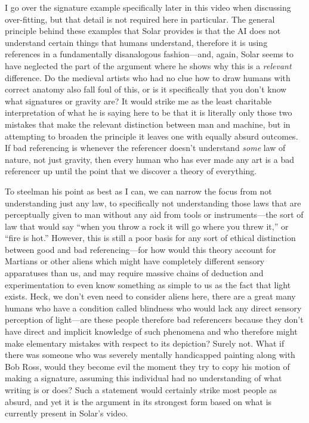 \documentclass[11pt]{article}
\begin{document}
I go over the signature example specifically later in this video when discussing over-fitting, but that detail is not required here in particular. The general principle behind these examples that Solar provides is that the AI does not understand certain things that humans understand, therefore it is using references in a fundamentally disanalogous fashion---and, again, Solar seems to have neglected the part of the argument where he shows why this is a \emph{relevant} difference. Do the medieval artists who had no clue how to draw humans with correct anatomy also fall foul of this, or is it specifically that you don't know what signatures or gravity are? It would strike me as the least charitable interpretation of what he is saying here to be that it is literally only those two mistakes that make the relevant distinction between man and machine, but in attempting to broaden the principle it leaves one with equally absurd outcomes. If bad referencing is whenever the referencer doesn't understand \emph{some} law of nature, not just gravity, then every human who has ever made any art is a bad referencer up until the point that we discover a theory of everything.

To steelman his point as best as I can, we can narrow the focus from not understanding just any law, to specifically not understanding those laws that are perceptually given to man without any aid from tools or instruments---the sort of law that would say ``when you throw a rock it will go where you threw it,'' or ``fire is hot.'' However, this is still a poor basis for any sort of ethical distinction between good and bad referencing---for how would this theory account for Martians or other aliens which might have completely different sensory apparatuses than us, and may require massive chains of deduction and experimentation to even know something as simple to us as the fact that light exists. Heck, we don't even need to consider aliens here, there are a great many humans who have a condition called blindness who would lack any direct sensory perception of light---are these people therefore bad referencers because they don't have direct and implicit knowledge of such phenomena and who therefore might make elementary mistakes with respect to its depiction? Surely not. What if there was someone who was severely mentally handicapped painting along with Bob Ross, would they become evil the moment they try to copy his motion of making a signature, assuming this individual had no understanding of what writing is or does? Such a statement would certainly strike most people as absurd, and yet it is the argument in its strongest form based on what is currently present in Solar's video.
\end{document}
